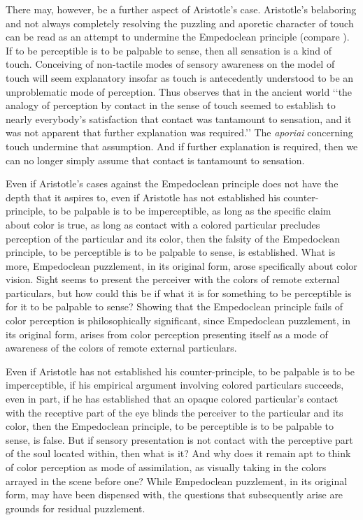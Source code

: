 There may, however, be a further aspect of Aristotle's case. Aristotle's belaboring and not always completely resolving the puzzling and aporetic character of touch can be read as an attempt to undermine the Empedoclean principle (compare \citealt[``When our eyes touch \ldots'']{Derrida:2005aa}). If to be perceptible is to be palpable to sense, then all sensation is a kind of touch. Conceiving of non-tactile modes of sensory awareness on the model of touch will seem explanatory insofar as touch is antecedently understood to be an unproblematic mode of perception. Thus \citet[39]{Lindberg:1977aa} observes that in the ancient world ‘‘the analogy of perception by contact in the sense of touch seemed to establish to nearly everybody’s satisfaction that contact was tantamount to sensation, and it was not apparent that further explanation was required.’’ The \emph{aporiai} concerning touch undermine that assumption. And if further explanation is required, then we can no longer simply assume that contact is tantamount to sensation.

Even if Aristotle's cases against the Empedoclean principle does not have the depth that it aspires to, even if Aristotle has not established his counter-principle, to be palpable is to be imperceptible, as long as the specific claim about color is true, as long as contact with a colored particular precludes perception of the particular and its color, then the falsity of the Empedoclean principle, to be perceptible is to be palpable to sense, is established. What is more, Empedoclean puzzlement, in its original form, arose specifically about color vision. Sight seems to present the perceiver with the colors of remote external particulars, but how could this be if what it is for something to be perceptible is for it to be palpable to sense? Showing that the Empedoclean principle fails of color perception is philosophically significant, since Empedoclean puzzlement, in its original form, arises from color perception presenting itself as a mode of awareness of the colors of remote external particulars. 

Even if Aristotle has not established his counter-principle, to be palpable is to be imperceptible, if his empirical argument involving colored particulars succeeds, even in part, if he has established that an opaque colored particular's contact with the receptive part of the eye blinds the perceiver to the particular and its color, then the Empedoclean principle, to be perceptible is to be palpable to sense, is false. But if sensory presentation is not contact with the perceptive part of the soul located within, then what is it? And why does it remain apt to think of color perception as mode of assimilation, as visually taking in the colors arrayed in the scene before one? While Empedoclean puzzlement, in its original form, may have been dispensed with, the questions that subsequently arise are grounds for residual puzzlement.


